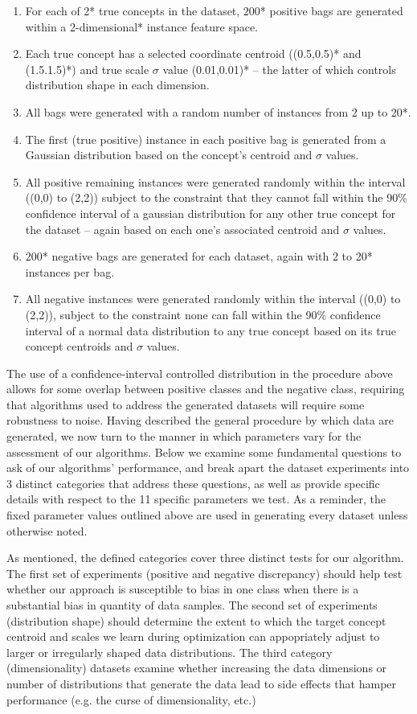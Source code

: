 \documentclass[12pt,dvips]{report}
\numberwithin{equation}{section}
\begin{document}
\begin{enumerate}
  \item For each of 2* true concepts in the dataset, 200* positive bags are generated within a 2-dimensional* instance feature space.
  \item Each true concept has a selected coordinate centroid ((0.5,0.5)* and (1.5.1.5)*) and true scale $\sigma$ value (0.01,0.01)* -- the latter of which controls distribution shape in each dimension.
  \item All bags were generated with a random number of instances from 2 up to 20*.
  \item The first (true positive) instance in each positive bag is generated from a Gaussian distribution based on the concept's centroid and $\sigma$ values.
  \item All positive remaining instances were generated randomly within the interval ((0,0) to (2,2)) subject to the constraint that they cannot fall within the 90\% confidence interval of a gaussian distribution for any other true concept for the dataset -- again based on each one's associated centroid and $\sigma$ values.
  \item 200* negative bags are generated for each dataset, again with 2 to 20* instances per bag.
  \item All negative instances were generated randomly within the interval ((0,0) to (2,2)), subject to the constraint none can fall within the 90\% confidence interval of a normal data distribution to any true concept based on its true concept centroids and $\sigma$ values.
\end{enumerate}  

The use of a confidence-interval controlled distribution in the procedure above allows for some overlap between positive classes and the negative class, requiring that algorithms used to address the generated datasets will require some robustness to noise. Having described the general procedure by which data are generated, we now turn to the manner in which parameters vary for the assessment of our algorithms.  Below we examine some fundamental questions to ask of our algorithms' performance, and break apart the dataset experiments into 3 distinct categories that address these questions, as well as provide specific details with respect to the 11 specific parameters we test.  As a reminder, the fixed parameter values outlined above are used in generating every dataset unless otherwise noted.

As mentioned, the defined categories cover three distinct tests for our algorithm.  The first set of experiments (positive and negative discrepancy) should help test whether our approach is susceptible to bias in one class when there is a substantial bias in quantity of data samples.  The second set of experiments (distribution shape) should determine the extent to which the target concept centroid and scales we learn during optimization can appopriately adjust to larger or irregularly shaped data distributions.  The third category (dimensionality) datasets examine whether increasing the data dimensions or number of distributions that generate the data lead to side effects that hamper performance (e.g. the curse of dimensionality, etc.)
\end{document}
